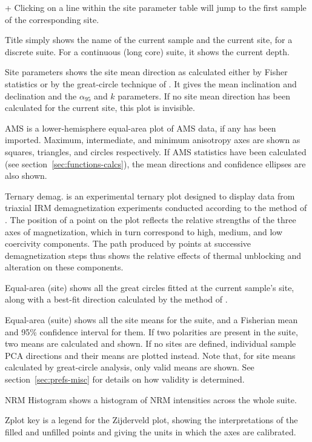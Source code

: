 \documentclass[a4paper,british]{article}
\newcommand{\menuitemlabel}[1]{%
\mbox{\textsf{#1}}\hfil}
\newenvironment{menuitemlist}%
{\begin{list}{}{%
\renewcommand{\makelabel}{\menuitemlabel}%
\setlength{\labelwidth}{35pt}%
\setlength{\leftmargin}%
             {\labelwidth+\labelsep}}}%
{\end{list}}
\newcommand{\caps}[1]{\MakeTextUppercase{#1}} %
\newcommand{\alnifi}{$\alpha_{95}$}
\begin{document}
\begin{menuitemlist}
  Clicking on a line within the site parameter table will jump to the first
  sample of the corresponding site.

\item[Title] simply shows the name of the current sample and the current
  site, for a discrete suite. For a continuous (long core) suite, it shows
  the current depth.

\item[Site parameters] shows the site mean direction as calculated either by
  Fisher statistics or by the great-circle technique of
  \cite{mcfadden1988circles}. It gives the mean inclination and declination
  and the \alnifi{} and $k$ parameters. If no site mean direction has been
  calculated for the current site, this plot is invisible.

\item[\caps{Ams}] is a lower-hemisphere equal-area plot of \caps{ams} data,
  if any has been imported. Maximum, intermediate, and minimum anisotropy
  axes are shown as squares, triangles, and circles respectively. If
  \caps{ams} statistics have been calculated (see
  section~\ref{sec:functions-calcs}), the mean directions and confidence
  ellipses are also shown.

\item[Ternary demag.] is an experimental ternary plot designed to display
  data from triaxial \caps{irm} demagnetization experiments conducted
  according to the method of \cite{lowrie1990identification}. The position of
  a point on the plot reflects the relative strengths of the three axes of
  magnetization, which in turn correspond to high, medium, and low coercivity
  components. The path produced by points at successive demagnetization steps
  thus shows the relative effects of thermal unblocking and alteration on
  these components.

\item[Equal-area (site)] shows all the great circles fitted at the current
  sample's site, along with a best-fit direction calculated by the method of
  \cite{mcfadden1988circles}.

\item[Equal-area (suite)] shows all the site means for the suite, and a
  Fisherian mean and 95\% confidence interval for them. If two polarities are
  present in the suite, two means are calculated and shown. If no sites
  are defined, individual sample \caps{pca} directions and their means
  are plotted instead. Note that, for site means calculated by great-circle
  analysis, only valid means are shown. See section~\ref{sec:prefs-misc}
  for details on how validity is determined.

\item[\caps{Nrm} Histogram] shows a histogram of \caps{nrm} intensities
  across the whole suite.

\item[Zplot key] is a legend for the Zijderveld plot, showing the
  interpretations of the filled and unfilled points and giving the units in
  which the axes are calibrated.

\end{menuitemlist}
\end{document}

